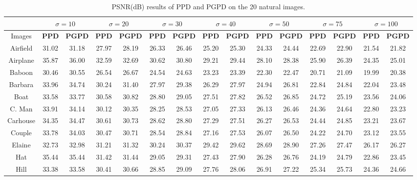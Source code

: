 \begin{table}[t!]
\begin{adjustwidth}{-1.5cm}{}
\scriptsize
\caption{PSNR(dB) results of PPD and PGPD on the 20 natural images.}
\label{tab2-1}
\centering
\begin{tabular}{|c||c|c||c|c||c|c||c|c||c|c||c|c||c|c|}
\hline
&\multicolumn{2}{c||}{ $\sigma = 10$}&\multicolumn{2}{c||}{ $\sigma = 20$}&\multicolumn{2}{c||}{ $\sigma = 30$}
&\multicolumn{2}{c||}{ $\sigma = 40$}&\multicolumn{2}{c||}{ $\sigma = 50$}&\multicolumn{2}{c||}{ $\sigma = 75$}
&\multicolumn{2}{c|}{ $\sigma = 100$}
\\
\hline
\hline
Images&\textbf{PPD}&\textbf{PGPD}&\textbf{PPD}&\textbf{PGPD}&\textbf{PPD}&\textbf{PGPD}&\textbf{PPD}&\textbf{PGPD}&\textbf{PPD}
&\textbf{PGPD}&\textbf{PPD}&\textbf{PGPD}&\textbf{PPD}&\textbf{PGPD}
\\
\hline
Airfield&31.02 &31.18  &27.97&28.19  &26.33& 26.46   &25.20 & 25.30  & 24.33 & 24.44  &22.69 &22.90   &21.54&21.82 
\\
\hline
Airplane&35.87 &36.00     &32.59&32.69   &30.62&30.80 &29.21&29.44  &28.10& 28.38    &25.90& 26.39  &24.35 &25.01
\\
\hline
Baboon&30.46&30.55   &26.54&26.67  &24.54 & 24.63 & 23.23&23.39  & 22.30&22.47    &20.71 & 21.09   &19.99 &20.38
\\
\hline 
Barbara&33.96&34.74    &30.24&31.40 & 27.97 & 29.38 & 26.29 & 27.97  &24.94 & 26.81  &22.84 &24.84   &22.04&23.48
\\
\hline
Boat&33.58&33.77     &30.58&30.82    & 28.80 &  29.05  &27.51 & 27.82   & 26.52 &  26.85   & 24.72 &25.19  & 23.56&24.06       
\\
\hline
C. Man&33.91&34.14     &30.12&30.35  & 28.25& 28.53  & 27.05& 27.33  & 26.13 & 26.46  &24.36 &24.64    &22.80 &23.23 
\\
\hline
Carhouse&34.35 &34.47     &30.61&30.73   &28.62 & 28.80  & 27.29&27.51  &26.27 &26.53  &24.44&24.85    &23.21&23.67
\\
\hline
Couple &33.78&34.03       &30.47&30.71  & 28.54 & 28.84 & 27.16 & 27.53   &26.07 & 26.50  &24.22 &24.70   &23.12 &23.55
\\
\hline
Elaine&32.73&32.98   &31.21&31.32    &30.24& 30.37   &29.42&29.62   &28.69 &28.90   &27.26&27.47   &26.17&26.27
\\
\hline
Hat&35.44&35.44      &31.42 &31.44  & 29.05&29.31   &27.43&27.90  & 26.28 &26.76  &24.19 & 24.79    &22.86&23.45
\\
\hline
Hill&33.38&33.58     &30.41&30.66   &28.85 & 29.09   &27.76 & 28.06  & 26.91 &27.22  &25.34 & 25.73   &24.36 &24.66

\end{tabular}
\end{adjustwidth}
\end{table}
